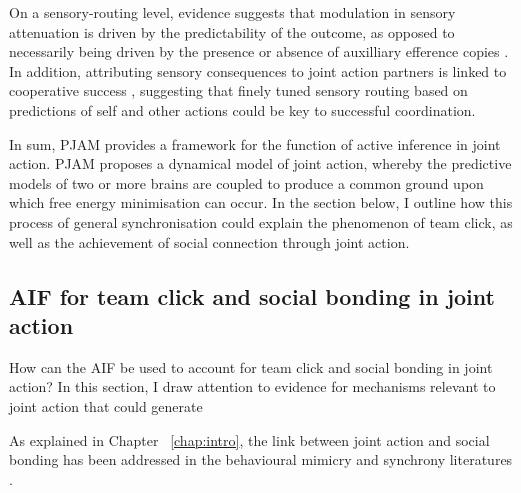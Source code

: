 \begin{CJK}{UTF8}{gbsn}
On a sensory-routing level, evidence suggests that modulation in sensory attenuation is driven by the predictability of the outcome, as opposed to necessarily being driven by the presence or absence of auxilliary efference copies \citep{Sato2008}.  In addition, attributing sensory consequences to joint action partners is linked to cooperative success \citep{Chaminade2012}, suggesting that finely tuned sensory routing based on predictions of self and other actions could be key to successful coordination.

In sum, PJAM provides a framework for the function of active inference in joint action.  PJAM proposes a dynamical model of joint action, whereby the predictive models of two or more brains are coupled to produce a common ground upon which free energy minimisation can occur.  In the section below, I outline how this process of general synchronisation could explain the phenomenon of team click, as well as the achievement of social connection through joint action.



\subsection{AIF for team click and social bonding in joint action\label{sect:AIFclickBonding}}

How can the AIF be used to account for team click and social bonding in joint action? In this section, I draw attention to evidence for mechanisms relevant to joint action that could generate

As explained in Chapter ~\ref{chap:intro}, the link between joint action and social bonding has been addressed in the behavioural mimicry and synchrony literatures \citep[see Chapter ~\ref{chap:intro} Section ~\ref{sect:socialHigh}.
There is now strong evidence to suggest that a combination of 1) neuropharmacological reward arising from lower-cognitive affective mechanisms, 2) self-other merging resulting from neurocognitive alignment \citep{Rizzolatti2010}, and 3) reinforcement of cooperative relationships owing to experience of interpersonal association in joint action \citep{Reddish2013} generates a psychophysiological environment conducive to generating social bonds.

Yet, almost all of these studies operationalise joint action as exact in-phase behavioural synchrony, and there is much less substantive evidence of the bonding effects of complex and dynamic joint action scenarios \citep[but see][]{Marsh2009,Miles2009,Lumsden2012}.


\end{CJK}
